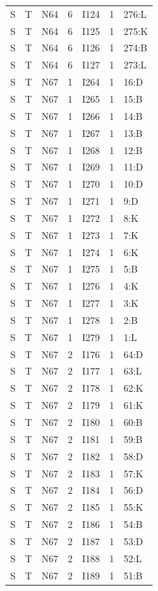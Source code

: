 {\begin{longtable}{lllrlrp{.35\linewidth}}
S & T & N64 & 6 & I124 & 1 & 276:L \\
S & T & N64 & 6 & I125 & 1 & 275:K \\
S & T & N64 & 6 & I126 & 1 & 274:B \\
S & T & N64 & 6 & I127 & 1 & 273:L \\
S & T & N67 & 1 & I264 & 1 & 16:D \\
S & T & N67 & 1 & I265 & 1 & 15:B \\
S & T & N67 & 1 & I266 & 1 & 14:B \\
S & T & N67 & 1 & I267 & 1 & 13:B \\
S & T & N67 & 1 & I268 & 1 & 12:B \\
S & T & N67 & 1 & I269 & 1 & 11:D \\
S & T & N67 & 1 & I270 & 1 & 10:D \\
S & T & N67 & 1 & I271 & 1 & 9:D \\
S & T & N67 & 1 & I272 & 1 & 8:K \\
S & T & N67 & 1 & I273 & 1 & 7:K \\
S & T & N67 & 1 & I274 & 1 & 6:K \\
S & T & N67 & 1 & I275 & 1 & 5:B \\
S & T & N67 & 1 & I276 & 1 & 4:K \\
S & T & N67 & 1 & I277 & 1 & 3:K \\
S & T & N67 & 1 & I278 & 1 & 2:B \\
S & T & N67 & 1 & I279 & 1 & 1:L \\
S & T & N67 & 2 & I176 & 1 & 64:D \\
S & T & N67 & 2 & I177 & 1 & 63:L \\
S & T & N67 & 2 & I178 & 1 & 62:K \\
S & T & N67 & 2 & I179 & 1 & 61:K \\
S & T & N67 & 2 & I180 & 1 & 60:B \\
S & T & N67 & 2 & I181 & 1 & 59:B \\
S & T & N67 & 2 & I182 & 1 & 58:D \\
S & T & N67 & 2 & I183 & 1 & 57:K \\
S & T & N67 & 2 & I184 & 1 & 56:D \\
S & T & N67 & 2 & I185 & 1 & 55:K \\
S & T & N67 & 2 & I186 & 1 & 54:B \\
S & T & N67 & 2 & I187 & 1 & 53:D \\
S & T & N67 & 2 & I188 & 1 & 52:L \\
S & T & N67 & 2 & I189 & 1 & 51:B \\

\end{longtable}}
